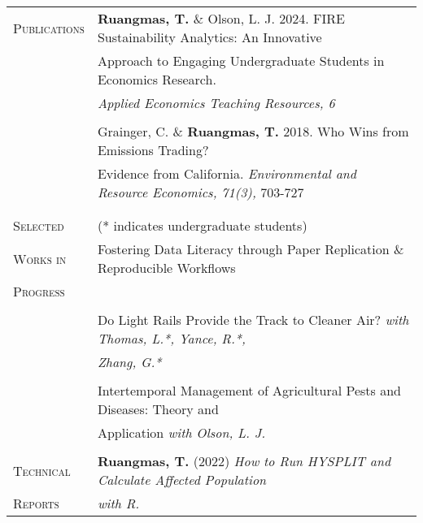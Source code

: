 \documentclass[letterpaper,11pt,oneside]{article}\usepackage[]{graphicx}\usepackage[]{xcolor}
\begin{document}
\noindent \begin{tabular}{p{1.2in} l}
\textsc{Publications}   & \textbf{Ruangmas, T.} \& Olson, L. J. 2024. FIRE Sustainability Analytics: An Innovative \\
				                & Approach to Engaging Undergraduate Students in Economics Research. \\
				                & \textit{Applied Economics Teaching Resources, 6} \href{https://www.aetrjournal.org/advance-access/special-issue-on-undergraduate-research-in-agricultural-and-applied-economics/fire-sustainability-analytics-an-innovative-approach-to-engaging-undergraduate-students-in-economics-research}{\color{blue}{[LINK]}} \\
	                      & \\  
                        & Grainger, C. \& \textbf{Ruangmas, T.} 2018. Who Wins from Emissions Trading? \\
				                & Evidence from California. \textit{Environmental and Resource Economics, 71(3),} 703-727 \\
				                & \href{https://doi.org/10.1007/s10640-017-0180-1}{\color{blue}{[LINK]}} \\
				                & \\   
\textsc{Selected} & (* indicates undergraduate students) \\
\textsc{Works in} & Fostering Data Literacy through Paper Replication \& Reproducible Workflows \\
\textsc{Progress} & \href{https://github.com/ruangmas/ruangmas.github.io/blob/main/documents/FosteringDataLiteracy.pdf}{\color{blue}{[LINK]}} \\
	                & \\
	                & Do Light Rails Provide the Track to Cleaner Air? \textit{with Thomas, L.*, Yance, R.*,} \\
	                & \textit{Zhang, G.*} \\
	                & \\	                
                	& Intertemporal Management of Agricultural Pests and Diseases: Theory and \\			
                  & Application \textit{with Olson, L. J.}\\
                  & \\
\textsc{Technical} & \textbf{Ruangmas, T.} (2022) \textit{How to Run HYSPLIT and Calculate Affected Population} \\
\textsc{Reports}   & \textit{with R.} \href{https://ruangmas.github.io/hysplit.html}{\color{blue}{[LINK]}} \\

\end{tabular}
\end{document}
